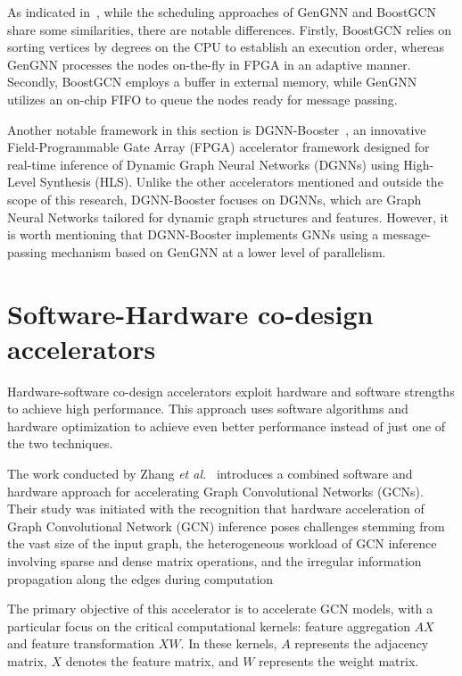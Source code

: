 As indicated in~\cite{DBLP:journals/corr/abs-2201-08475}, while the scheduling approaches of GenGNN and BoostGCN share some similarities, there are notable differences.
Firstly, BoostGCN relies on sorting vertices by degrees on the CPU to establish an execution order, whereas GenGNN processes the nodes on-the-fly in FPGA in an adaptive manner.
Secondly, BoostGCN employs a buffer in external memory, while GenGNN utilizes an on-chip FIFO to queue the nodes ready for message passing.

Another notable framework in this section is DGNN-Booster~\cite{chen2023dgnnbooster}, an innovative Field-Programmable Gate Array (FPGA) accelerator framework designed for real-time inference of Dynamic Graph Neural Networks (DGNNs) using High-Level Synthesis (HLS).
Unlike the other accelerators mentioned and outside the scope of this research, DGNN-Booster focuses on DGNNs, which are Graph Neural Networks tailored for dynamic graph structures and features.
However, it is worth mentioning that DGNN-Booster implements GNNs using a message-passing mechanism based on GenGNN at a lower level of parallelism.

\section{Software-Hardware co-design accelerators}
\label{sec:software-hardware-accelerators}%

Hardware-software co-design accelerators exploit hardware and software strengths to achieve high performance.
This approach uses software algorithms and hardware optimization to achieve even better performance instead of just one of the two techniques.

The work conducted by Zhang \textit{et al.}~\cite{9153263} introduces a combined software and hardware approach for accelerating Graph Convolutional Networks (GCNs).
Their study was initiated with the recognition that hardware acceleration of Graph Convolutional Network (GCN) inference poses challenges stemming from the vast size of the input graph,
the heterogeneous workload of GCN inference involving sparse and dense matrix operations, and the irregular information propagation along the edges during computation

The primary objective of this accelerator is to accelerate GCN models, with a particular focus on the critical computational kernels: feature aggregation $AX$ and feature transformation $XW$.
In these kernels, $A$ represents the adjacency matrix, $X$ denotes the feature matrix, and $W$ represents the weight matrix.

